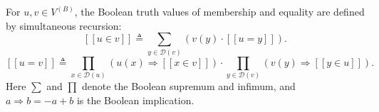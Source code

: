 For $u, v \in V^{(B)}$, the Boolean truth values of membership and equality are defined by simultaneous recursion:
$$[\![u \in v]\!] \triangleq \sum_{y \in \mathcal{D}(v)} (v(y) \cdot [\![u = y]\!]).$$
$$[\![u = v]\!] \triangleq \prod_{x \in \mathcal{D}(u)} (u(x) \Rightarrow [\![x \in v]\!]) \cdot \prod_{y \in \mathcal{D}(v)} (v(y) \Rightarrow [\![y \in u]\!]).$$
Here $\sum$ and $\prod$ denote the Boolean supremum and infimum, and $a \Rightarrow b = -a + b$ is the Boolean implication.
